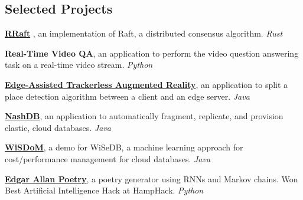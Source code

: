 \documentclass[margin,line]{res}
\begin{document}
\begin{resume}
\section{\sc Selected Projects} 
 \textbf{\href{https://github.com/ssemenova/raft}{RRaft}} , an implementation of Raft, a distributed consensus algorithm. \textit{Rust}
 
 \vspace*{-2.5mm}
 \textbf{Real-Time Video QA}, an application to perform the video question answering task on a real-time video stream. \textit{Python}
 
\vspace*{-2.5mm}
 \textbf{\href{https://sofiya.io/media/trackerlessAR.pdf}{Edge-Assisted Trackerless Augmented Reality}}, an application to split a place detection algorithm between a client and an edge server. \textit{Java}

\vspace*{-2.5mm}
\textbf{\href{https://dl.acm.org/doi/abs/10.1145/3183713.3196935}{NashDB}}, an application to automatically fragment, replicate, and provision elastic, cloud databases. \textit{Java}

\vspace*{-2.5mm}
 \textbf{\href{https://www.cs.brandeis.edu/~olga/publications/icde17-demo.pdf}{WiSDoM}}, a demo for WiSeDB, a machine learning approach for cost/performance management for cloud databases.  \textit{Java}
 
\vspace*{-2.5mm}
 \textbf{\href{https://github.com/RyanMarcus/EdgarAllanPoetry}{Edgar Allan Poetry}}, a poetry generator using RNNs and Markov chains. Won Best Artificial Intelligence Hack at HampHack. \textit{Python}
 

\end{resume}
\end{document}
